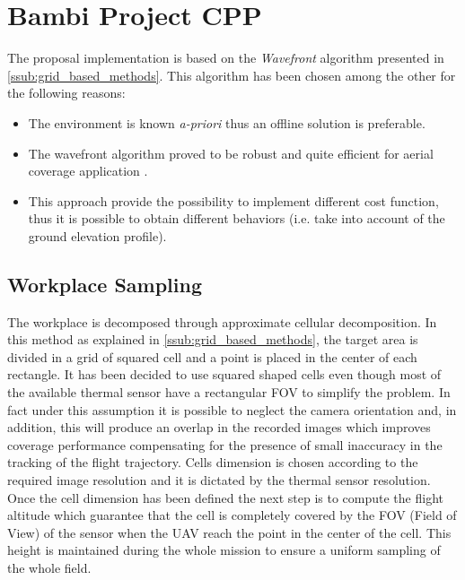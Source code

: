 
\section{Bambi Project CPP} %
\label{sec:proposal_solution}
The proposal implementation is based on the \textit{Wavefront} algorithm presented in \autoref{ssub:grid_based_methods}.
This algorithm has been chosen among the other for the following reasons:
\begin{itemize}
	\item The environment is known \textit{a-priori} thus an offline solution is preferable.
	\item The wavefront algorithm proved to be robust and quite efficient for aerial coverage application \cite{7496385}.
	\item This approach provide the possibility to implement different cost function, thus it is possible to obtain different behaviors (i.e. take into account of the ground elevation profile).
\end{itemize}

\subsection{Workplace Sampling} %
\label{sub:workplace_sampling}
The workplace is decomposed through approximate cellular decomposition. In this method as explained in \autoref{ssub:grid_based_methods}, the target area is divided in a grid of squared cell and a point is placed in the center of each rectangle. It has been decided to use squared shaped cells even though most of the available thermal sensor have a rectangular FOV to simplify the problem. In fact under this assumption it is possible to neglect the camera orientation and, in addition, this will produce an overlap in the recorded images which improves coverage performance compensating for the presence of small inaccuracy in the tracking of the flight trajectory. Cells dimension is chosen according to the required image resolution and it is dictated by the thermal sensor resolution. Once the cell dimension has been defined the next step is to compute the flight altitude which guarantee that the cell is completely covered by the FOV (Field of View) of the sensor when the UAV reach the point in the center of the cell. This height is maintained during the whole mission to ensure a uniform sampling of the whole field. \par

